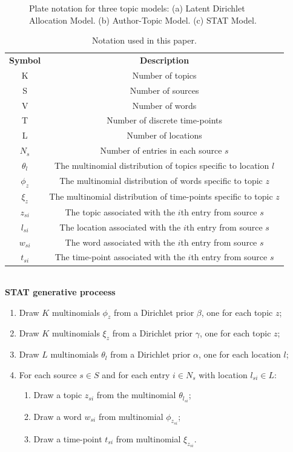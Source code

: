 \documentclass[conference]{IEEEtran}
\newcommand{\model}{{STAT}\xspace} %
\begin{document}
\begin{figure}[ht]
\begin{center}
\end{center}
\caption{Plate notation for three topic models: (a) Latent Dirichlet Allocation Model. (b) Author-Topic Model. (c) \model Model.}
\label{fig:models}
\end{figure}


\begin{table}
\small \centering
\caption{Notation used in this paper.}
\begin{tabular}{c c}
\hline
{\bf Symbol} & {\bf Description}  \\
K & Number of topics  \\
S & Number of sources \\
V & Number of words \\
T & Number of discrete time-points \\
L & Number of locations \\
$N_s$ & Number of entries in each source $s$\\
$\theta_l$ & The multinomial distribution of topics specific to location $l$\\
$\phi_z$ & The multinomial distribution of words specific to topic $z$\\
$\xi_z$ & The multinomial distribution of time-points specific to topic $z$\\
$z_{si}$ & The topic associated with the $i$th entry from source $s$ \\
$l_{si}$ & The location associated with the $i$th entry from source $s$ \\
$w_{si}$ & The word associated with the $i$th entry from source $s$ \\
$t_{si}$ & The time-point associated with the $i$th entry from source $s$ \\
\hline
\end{tabular}
\label{tab:notation}
\end{table}\vspace{-10pt}
\ \\{\bf \model generative proceess}
\begin{enumerate}
\item Draw $K$ multinomials $\phi_z$ from a Dirichlet prior $\beta$, one for each topic $z$;
\item Draw $K$ multinomials $\xi_z$ from a Dirichlet prior $\gamma$, one for each topic $z$;
\item Draw $L$ multinomials $\theta_l$ from a Dirichlet prior $\alpha$, one for each location $l$;
\item For each source  $s \in S$ and for each entry $i \in N_s$ with location $l_{si} \in L$:
\begin{enumerate}
\item Draw a topic $z_{si}$ from the multinomial $\theta_{l_{si}}$;
\item Draw a word $w_{si}$ from multinomial $\phi_{z_{si}}$;
\item Draw a time-point $t_{si}$ from multinomial $\xi_{z_{si}}$.
\end{enumerate}
\end{enumerate}
\end{document}
